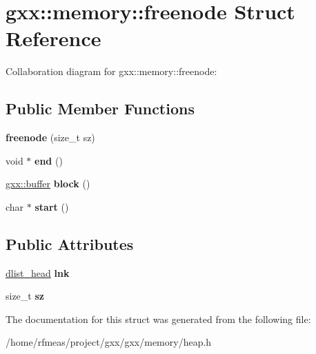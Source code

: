 \hypertarget{structgxx_1_1memory_1_1freenode}{}\section{gxx\+:\+:memory\+:\+:freenode Struct Reference}
\label{structgxx_1_1memory_1_1freenode}


Collaboration diagram for gxx\+:\+:memory\+:\+:freenode\+:
\subsection*{Public Member Functions}
\begin{DoxyCompactItemize}
\item 
{\bfseries freenode} (size\+\_\+t sz)\hypertarget{structgxx_1_1memory_1_1freenode_ad0347eea2ad0019ed0186e27a8e43860}{}\label{structgxx_1_1memory_1_1freenode_ad0347eea2ad0019ed0186e27a8e43860}

\item 
void $\ast$ {\bfseries end} ()\hypertarget{structgxx_1_1memory_1_1freenode_ab7a8df6c3ce18705a14eaf00251f3eea}{}\label{structgxx_1_1memory_1_1freenode_ab7a8df6c3ce18705a14eaf00251f3eea}

\item 
\hyperlink{classgxx_1_1buffer}{gxx\+::buffer} {\bfseries block} ()\hypertarget{structgxx_1_1memory_1_1freenode_aff775a886fae3feae7854b3333849589}{}\label{structgxx_1_1memory_1_1freenode_aff775a886fae3feae7854b3333849589}

\item 
char $\ast$ {\bfseries start} ()\hypertarget{structgxx_1_1memory_1_1freenode_a409fc63cb292df61e0bd8002261edc55}{}\label{structgxx_1_1memory_1_1freenode_a409fc63cb292df61e0bd8002261edc55}

\end{DoxyCompactItemize}
\subsection*{Public Attributes}
\begin{DoxyCompactItemize}
\item 
\hyperlink{structdlist__head}{dlist\+\_\+head} {\bfseries lnk}\hypertarget{structgxx_1_1memory_1_1freenode_a92f0cfe2deb4e046a6b0cc9b86417f57}{}\label{structgxx_1_1memory_1_1freenode_a92f0cfe2deb4e046a6b0cc9b86417f57}

\item 
size\+\_\+t {\bfseries sz}\hypertarget{structgxx_1_1memory_1_1freenode_a012f190e53666fcfbfc255b1d8173f05}{}\label{structgxx_1_1memory_1_1freenode_a012f190e53666fcfbfc255b1d8173f05}

\end{DoxyCompactItemize}


The documentation for this struct was generated from the following file\+:\begin{DoxyCompactItemize}
\item 
/home/rfmeas/project/gxx/gxx/memory/heap.\+h\end{DoxyCompactItemize}
